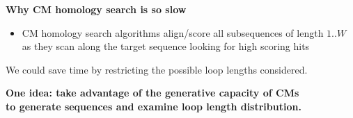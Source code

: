 \documentclass[landscape]{slides}
\begin{document}
\begin{slide}
\begin{center}
\textbf{Why CM homology search is so slow}
\end{center}

\medskip
\small
\begin{itemize}

\item
CM homology search algorithms align/score all subsequences of length
$1..W$ \\ as they scan along the target sequence
looking for high scoring hits
\end{itemize}


  We could save time by restricting the possible loop lengths
  considered.

  {\bf One idea: take advantage of the generative capacity of CMs \\ to generate
  sequences and examine loop length distribution.}

\vfill
\end{slide}
\end{document}
